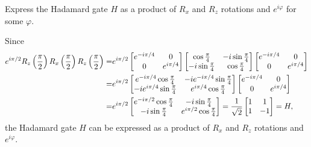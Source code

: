 \documentclass[en]{sol-man}
\begin{document}
\begin{exe}
    Express the Hadamard gate $H$ as a product of $R_x$ and $R_z$ rotations and $e^{i\varphi}$ for some $\varphi$.
\end{exe}
\begin{pf}
    Since
    \begin{align}
        \notag e^{i\pi/2}R_z\left(\frac{\pi}{2}\right)R_x\left(\frac{\pi}{2}\right)R_z\left(\frac{\pi}{2}\right)=&e^{i\pi/2}\begin{bmatrix}
            e^{-i\pi/4}&0\\
            0&e^{i\pi/4}
        \end{bmatrix}\begin{bmatrix}
            \cos\frac{\pi}{4}&-i\sin\frac{\pi}{4}\\
            -i\sin\frac{\pi}{4}&\cos\frac{\pi}{4}
        \end{bmatrix}\begin{bmatrix}
            e^{-i\pi/4}&0\\
            0&e^{i\pi/4}
        \end{bmatrix}\\
        \notag=&e^{i\pi/2}\begin{bmatrix}
            e^{-i\pi/4}\cos\frac{\pi}{4}&-ie^{-i\pi/4}\sin\frac{\pi}{4}\\
            -ie^{i\pi/4}\sin\frac{\pi}{4}&e^{i\pi/4}\cos\frac{\pi}{4}
        \end{bmatrix}\begin{bmatrix}
            e^{-i\pi/4}&0\\
            0&e^{i\pi/4}
        \end{bmatrix}\\
        \notag=&e^{i\pi/2}\begin{bmatrix}
            e^{-i\pi/2}\cos\frac{\pi}{4}&-i\sin\frac{\pi}{4}\\
            -i\sin\frac{\pi}{4}&e^{i\pi/2}\cos\frac{\pi}{4}
        \end{bmatrix}=\frac{1}{\sqrt{2}}\begin{bmatrix}
            1&1\\
            1&-1
        \end{bmatrix}=H,
    \end{align}
    the Hadamard gate $H$ can be expressed as a product of $R_x$ and $R_z$ rotations and $e^{i\varphi}$.
\end{pf}
\end{document}
